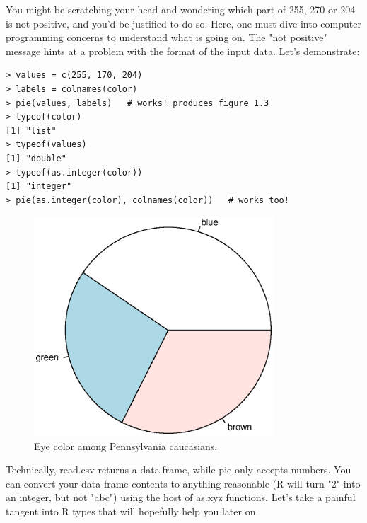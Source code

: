 \documentclass{report}
\newcommand{\code}[1]{\textsf{\ttfamily #1}}
\begin{document}
You might be scratching your head and wondering which part of 255, 270 or 204 is not positive, and you'd be justified to do so. Here, one must dive into computer programming concerns to understand what is going on. The "not positive" message hints at a problem with the format of the input data. Let's demonstrate:
\begin{verbatim}
> values = c(255, 170, 204)
> labels = colnames(color)
> pie(values, labels)	# works! produces figure 1.3
> typeof(color)
[1] "list"
> typeof(values)
[1] "double"
> typeof(as.integer(color))
[1] "integer"
> pie(as.integer(color), colnames(color))	# works too!
\end{verbatim}
\begin{figure}[h]
	\centering
	\includegraphics[width=0.8\textwidth]{pie.eps}
	\caption{Eye color among Pennsylvania caucasians.}
\label{fig:pie}
\end{figure}

Technically, \code{read.csv} returns a \code{data.frame}, while \code{pie} only accepts numbers. You can convert your data frame contents to anything reasonable (R will turn "2" into an integer, but not "abc") using the host of \code{as.xyz} functions. Let's take a painful tangent into R types that will hopefully help you later on.
\end{document}
